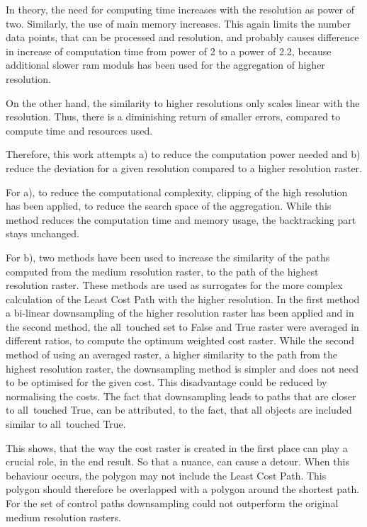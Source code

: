 In theory, the need for computing time increases with the resolution as power of two. 
Similarly, the use of main memory increases. 
This again limits the number data points, that can be processed and resolution, and probably causes difference in increase of computation time from power of 2 to a power of 2.2, because additional slower ram moduls has been used for the aggregation of higher resolution.

On the other hand, the similarity to higher resolutions only scales linear with the resolution. 
Thus, there is a diminishing return of smaller errors, compared to compute time and resources used.

Therefore, this work attempts a) to reduce the computation power needed and b) reduce the deviation for a given resolution compared to a higher resolution raster.

For a), to reduce the computational complexity, clipping of the high resolution has been applied, to reduce the search space of the aggregation.
While this method reduces the computation time and memory usage, the backtracking part stays unchanged.

For b), two methods have been used to increase the similarity of the paths computed from the medium resolution raster, to the path of the highest resolution raster.
These methods are used as surrogates for the more complex calculation of the Least Cost Path with the higher resolution.
In the first method a bi-linear downsampling of the higher resolution raster has been applied and in the second method, the all~touched set to False and True raster were averaged in different ratios, to compute the optimum weighted cost raster.
While the second method of using an averaged raster, a higher similarity to the path from the highest resolution raster, the downsampling method is simpler and does not need to be optimised for the given cost.
This disadvantage could be reduced by normalising the costs.
The fact that downsampling leads to paths that are closer to all~touched True, can be attributed, to the fact, that all objects are included similar to all~touched True.

This shows, that the way the cost raster is created in the first place can play a crucial role, in the end result.
So that a nuance, can cause a detour.
When this behaviour occurs, the polygon may not include the Least Cost Path.
This polygon should therefore be overlapped with a polygon around the shortest path.
For the set of control paths downsampling could not outperform the original medium resolution rasters.

